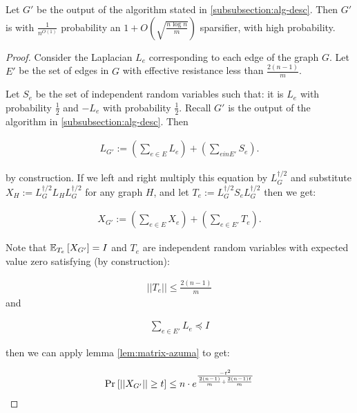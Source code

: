 \documentclass[12pt]{article}
\begin{document}
  \begin{lemma} Let $G'$ be the output of the algorithm stated in
  \ref{subsubsection:alg-desc}. Then $G'$ is with $\frac{1}{n^{O(1)}}$ probability an $1+O\left(\sqrt{\frac{n \log n}{m}}\right)$ sparsifier, with high probability. \end{lemma}
    \begin{proof}
      Consider the Laplacian $L_e$ corresponding to each edge of the graph $G$. Let
      $E'$ be the set of edges in $G$ with effective resistance less than
      $\frac{2(n-1)}{m}$.
      
      Let $S_e$ be the set of independent random variables such that: it is
      $L_e$ with probability $\frac{1}{2}$ and $-L_e$ with probability
      $\frac{1}{2}$. Recall $G'$ is the output of the algorithm in
      \ref{subsubsection:alg-desc}. Then 

      \begin{align}
        L_{G'} := \left(\sum_{e \in E} L_e \right) + \left(\sum_{e in E'}
      S_e\right).
      \end{align}

      by construction. If we left and right multiply this equation by $L_G^{\dag/2}$ and
      substitute $X_{H} := L_G^{\dag/2} L_{H} L_G^{\dag/2}$ for any graph $H$,
      and let $T_e := L_G^{\dag/2} S_{e} L_G^{\dag/2}$ then we
      get: 

      \begin{align}
      X_{G'} := \left(\sum_{e \in E} X_e\right) + \left(\sum_{e \in E'}
      T_e\right).
      \end{align}

      Note that ${\mathbb{E}}_{T_e}\left[ X_{G'} \right] = I$ and $T_e$ are independent random
      variables with expected value zero satisfying (by construction):

      \begin{align}
      ||T_e|| \leq \frac{2(n-1)}{m}
      \end{align}
      and 


      \begin{align}
      \sum_{e \in E'} L_e \preceq I
      \end{align}

      then we can apply lemma \ref{lem:matrix-azuma} to get:

      \begin{align}
      \mbox{Pr}_{}\left[ ||X_{G'} || \geq t \right] \leq n \cdot
      e^{\frac{-t^2}{\frac{2(n-1)}{m} + \frac{2(n-1)t}{m}}}
      \end{align}


\end{proof}
\end{document}
